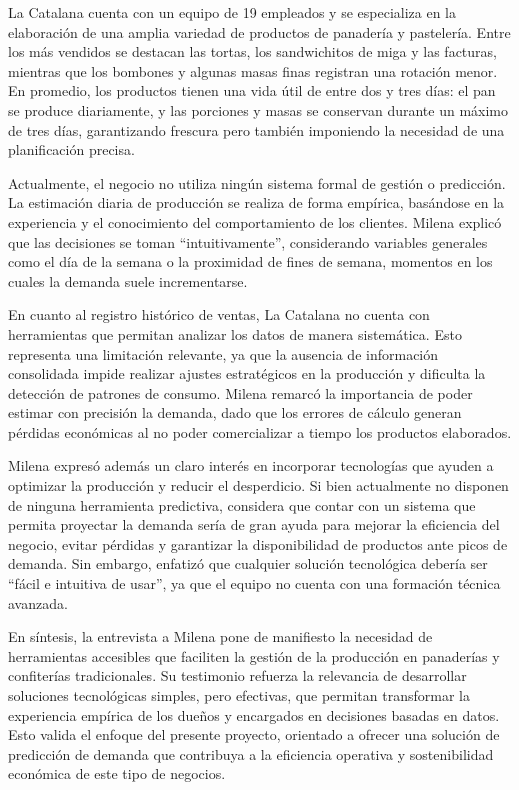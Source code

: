 La Catalana cuenta con un equipo de 19 empleados y se especializa en la elaboración de una amplia variedad de productos de panadería y pastelería. Entre los más vendidos se destacan las tortas, los sandwichitos de miga y las facturas, mientras que los bombones y algunas masas finas registran una rotación menor. En promedio, los productos tienen una vida útil de entre dos y tres días: el pan se produce diariamente, y las porciones y masas se conservan durante un máximo de tres días, garantizando frescura pero también imponiendo la necesidad de una planificación precisa.

Actualmente, el negocio no utiliza ningún sistema formal de gestión o predicción. La estimación diaria de producción se realiza de forma empírica, basándose en la experiencia y el conocimiento del comportamiento de los clientes. Milena explicó que las decisiones se toman “intuitivamente”, considerando variables generales como el día de la semana o la proximidad de fines de semana, momentos en los cuales la demanda suele incrementarse.

En cuanto al registro histórico de ventas, La Catalana no cuenta con herramientas que permitan analizar los datos de manera sistemática. Esto representa una limitación relevante, ya que la ausencia de información consolidada impide realizar ajustes estratégicos en la producción y dificulta la detección de patrones de consumo. Milena remarcó la importancia de poder estimar con precisión la demanda, dado que los errores de cálculo generan pérdidas económicas al no poder comercializar a tiempo los productos elaborados.

Milena expresó además un claro interés en incorporar tecnologías que ayuden a optimizar la producción y reducir el desperdicio. Si bien actualmente no disponen de ninguna herramienta predictiva, considera que contar con un sistema que permita proyectar la demanda sería de gran ayuda para mejorar la eficiencia del negocio, evitar pérdidas y garantizar la disponibilidad de productos ante picos de demanda. Sin embargo, enfatizó que cualquier solución tecnológica debería ser “fácil e intuitiva de usar”, ya que el equipo no cuenta con una formación técnica avanzada.

En síntesis, la entrevista a Milena pone de manifiesto la necesidad de herramientas accesibles que faciliten la gestión de la producción en panaderías y confiterías tradicionales. Su testimonio refuerza la relevancia de desarrollar soluciones tecnológicas simples, pero efectivas, que permitan transformar la experiencia empírica de los dueños y encargados en decisiones basadas en datos. Esto valida el enfoque del presente proyecto, orientado a ofrecer una solución de predicción de demanda que contribuya a la eficiencia operativa y sostenibilidad económica de este tipo de negocios.


